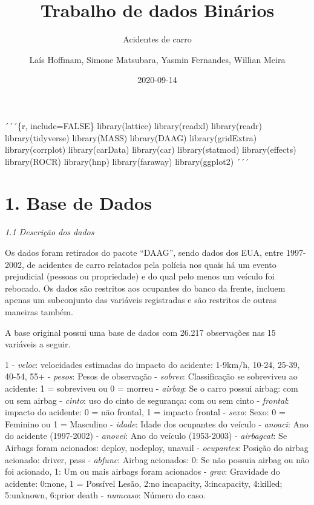 \documentclass[
]{article}
\title{Trabalho de dados Binários}
\subtitle{Acidentes de carro}
\author{Laís Hoffmam, Simone Matsubara, Yasmin Fernandes, Willian Meira}
\date{2020-09-14}
\begin{document}
\maketitle

´´´\{r, include=FALSE\} library(lattice) library(readxl) library(readr)
library(tidyverse) library(MASS) library(DAAG) library(gridExtra)
library(corrplot) library(carData) library(car) library(statmod)
library(effects) library(ROCR) library(hnp) library(faraway)
library(ggplot2) ´´´

\hypertarget{base-de-dados}{%
\section{1. Base de Dados}\label{base-de-dados}}

\emph{1.1 Descrição dos dados}

Os dados foram retirados do pacote ``DAAG'', sendo dados dos EUA, entre
1997-2002, de acidentes de carro relatados pela polícia nos quais há um
evento prejudicial (pessoas ou propriedade) e do qual pelo menos um
veículo foi rebocado. Os dados são restritos aos ocupantes do banco da
frente, incluem apenas um subconjunto das variáveis registradas e são
restritos de outras maneiras também.

A base original possui uma base de dados com 26.217 observações nas 15
variáveis a seguir.

1 - \emph{veloc}: velocidades estimadas do impacto do acidente: 1-9km/h,
10-24, 25-39, 40-54, 55+  - \emph{pesos}: Pesos de observação
 - \emph{sobrev}: Classificação se sobreviveu ao acidente: 1 =
sobreviveu ou 0 = morreu  - \emph{airbag}: Se o carro possui
airbag: com ou sem airbag  - \emph{cinto}: uso do cinto de
segurança: com ou sem cinto  - \emph{frontal}: impacto do
acidente: 0 = não frontal, 1 = impacto frontal  - \emph{sexo}:
Sexo: 0 = Feminino ou 1 = Masculino  - \emph{idade}: Idade dos
ocupantes do veículo  - \emph{anoaci}: Ano do acidente
(1997-2002)  - \emph{anovei}: Ano do veículo (1953-2003)
 - \emph{airbagcat}: Se Airbags foram acionados: deploy,
nodeploy, unavail  - \emph{ocupantes}: Posição do airbag
acionado: driver, pass  - \emph{abfunc}: Airbag acionados: 0:
Se não possuia airbag ou não foi acionado, 1: Um ou mais airbags foram
acionados  - \emph{grav}: Gravidade do acidente: 0:none, 1 =
Possível Lesão, 2:no incapacity, 3:incapacity, 4:killed; 5:unknown,
6:prior death  - \emph{numcaso}: Número do caso.
\end{document}
